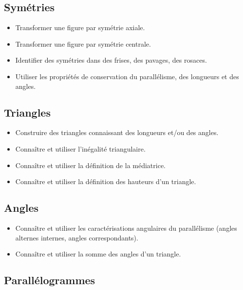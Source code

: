 \documentclass[a4paper,12pt,fleqn]{article}	
\begin{document}
\renewcommand{\labelitemi}{}

\subsection*{Symétries}

\begin{itemize}
	\item {}Transformer une figure par symétrie axiale.
	\item {}Transformer une figure par symétrie centrale.
	\item {}Identifier des symétries dans des frises, des pavages, des rosaces.
	\item {}Utiliser les propriétés de conservation du parallélisme, des longueurs et des angles.
\end{itemize}

\subsection*{Triangles}

\begin{itemize}
	\item {}Construire des triangles connaissant des longueurs et/ou des angles.
	\item {}Connaître et utiliser l'inégalité triangulaire.
	\item {}Connaître et utiliser la définition de la médiatrice.
	\item {}Connaître et utiliser la définition des hauteurs d’un triangle.
\end{itemize}

\subsection*{Angles}

\begin{itemize}
	\item {}Connaître et utiliser les caractérisations angulaires du parallélisme (angles alternes internes, angles correspondants).
	\item {}Connaître et utiliser la somme des angles d’un triangle.
\end{itemize}

\subsection*{Parallélogrammes}
\end{document}
